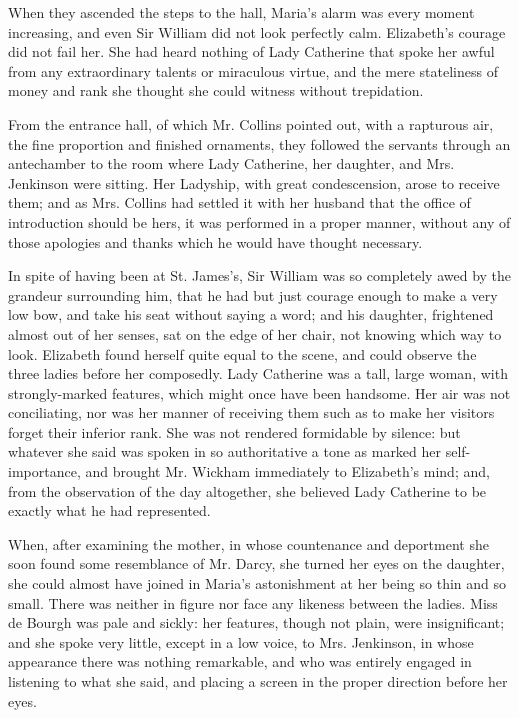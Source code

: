 \documentclass[12pt]{book}
\begin{document}
When they ascended the steps to the hall, Maria's alarm was every moment increasing, and even Sir William did not look perfectly calm. Elizabeth's courage did not fail her. She had heard nothing of Lady Catherine that spoke her awful from any extraordinary talents or miraculous virtue, and the mere stateliness of money and rank she thought she could witness without trepidation.

From the entrance hall, of which Mr. Collins pointed out, with a rapturous air, the fine proportion and finished ornaments, they followed the servants through an antechamber to the room where Lady Catherine, her daughter, and Mrs. Jenkinson were sitting. Her Ladyship, with great condescension, arose to receive them; and as Mrs. Collins had settled it with her husband that the office of introduction should be hers, it was performed in a proper manner, without any of those apologies and thanks which he would have thought necessary.

In spite of having been at St. James's, Sir William was so completely awed by the grandeur surrounding him, that he had but just courage enough to make a very low bow, and take his seat without saying a word; and his daughter, frightened almost out of her senses, sat on the edge of her chair, not knowing which way to look. Elizabeth found herself quite equal to the scene, and could observe the three ladies before her composedly. Lady Catherine was a tall, large woman, with strongly-marked features, which might once have been handsome. Her air was not conciliating, nor was her manner of receiving them such as to make her visitors forget their inferior rank. She was not rendered formidable by silence: but whatever she said was spoken in so authoritative a tone as marked her self-importance, and brought Mr. Wickham immediately to Elizabeth's mind; and, from the observation of the day altogether, she believed Lady Catherine to be exactly what he had represented.

When, after examining the mother, in whose countenance and deportment she soon found some resemblance of Mr. Darcy, she turned her eyes on the daughter, she could almost have joined in Maria's astonishment at her being so thin and so small. There was neither in figure nor face any likeness between the ladies. Miss de Bourgh was pale and sickly: her features, though not plain, were insignificant; and she spoke very little, except in a low voice, to Mrs. Jenkinson, in whose appearance there was nothing remarkable, and who was entirely engaged in listening to what she said, and placing a screen in the proper direction before her eyes.
\end{document}
